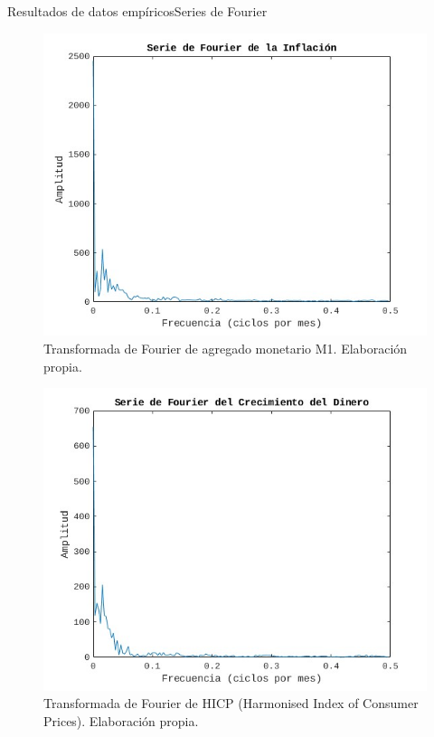 \documentclass[11pt]{beamer}
\begin{document}
    \begin{frame}{Resultados de datos empíricos}{Series de Fourier}
	\begin{multicols}{2}
	    \begin{figure}[H]
		\centering
		\includegraphics[scale=0.32]{fourierInflacion.jpg}
		\caption{\tiny Transformada de Fourier de agregado monetario M1. Elaboración propia.}
		\label{fig:M1}
	    \end{figure}

	    \begin{figure}[H]
		\centering
		\includegraphics[scale=0.32]{fourierDinero.jpg}
		\caption{\tiny Transformada de Fourier de HICP (Harmonised Index of Consumer Prices). Elaboración propia.}
		\label{fig:inf}
	    \end{figure}
	\end{multicols}
    \end{frame}
\end{document}

